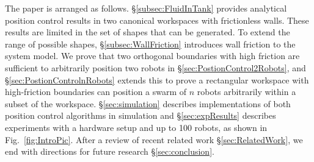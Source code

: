 The paper is arranged as follows. \S\ref{subsec:FluidInTank} provides analytical position control results in two canonical workspaces with frictionless walls.  These results are limited in the set of shapes that can be generated.  To extend the range of possible shapes, \S \ref{subsec:WallFriction} introduces wall friction to the system model.  We prove that two orthogonal boundaries with high friction are sufficient to arbitrarily position two robots in \S \ref{sec:PostionControl2Robots}, and \S \ref{sec:PostionControlnRobots} extends this to prove a rectangular workspace with high-friction boundaries can position a swarm of $n$ robots arbitrarily within a subset of the workspace.
\S \ref{sec:simulation} describes implementations of both position control algorithms in simulation and  \S \ref{sec:expResults} describes experiments with a hardware setup and up to 100 robots, as shown in Fig.~\ref{fig:IntroPic}. After a review of recent related work \S \ref{sec:RelatedWork}, we end with directions for future research \S \ref{sec:conclusion}.
